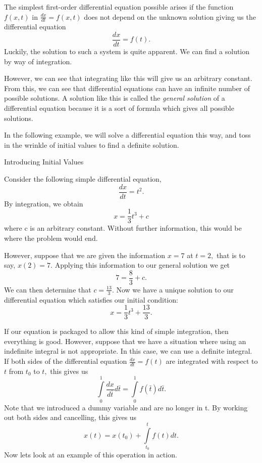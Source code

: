 The simplest first-order differential equation possible arises if the function $f(x,t)$ in $\frac{dx}{dt} = f(x,t)$ does not depend on the unknown solution giving us the differential equation $$\frac{dx}{dt} = f(t).$$ Luckily, the solution to such a system is quite apparent. We can find a solution by way of integration.\newline

However, we can see that integrating like this will give us an arbitrary constant. From this, we can see that differential equations can have an infinite number of possible solutions. A solution like this is called the \emph{general solution} of a differential equation because it is a sort of formula which gives all possible solutions.

 In the following example, we will solve a differential equation this way, and toss in the wrinkle of initial values to find a definite solution.

\begin{example} Introducing Initial Values\newline

Consider the following simple differential equation,
$$\frac{dx}{dt}	= t^2.$$
By integration, we obtain
$$x=\frac{1}{3}t^3 + c$$
where c is an arbitrary constant. Without further information, this would be where the problem would end.\newline

However, suppose that we are given the information $x=7$ at $t=2,$ that is to say, $x(2)=7.$ Applying this information to our general solution we get $$7 = \frac{8}{3} + c.$$ We can then determine that $c=\frac{13}{3}.$ Now we have a unique solution to our differential equation which satisfies our initial condition: $$x=\frac{1}{3}t^3+\frac{13}{3}.$$
\end{example}

If our equation is packaged to allow this kind of simple integration, then everything is good. However, suppose that we have a situation where using an indefinite integral is not appropriate. In this case, we can use a definite integral. If both sides of the differential equation $\frac{dx}{dt}=f(t)$ are integrated with respect to $t$ from $t_0$ to $t,$ this gives us $$\int\limits_0^1 \frac{dx}{d\bar{t}}d\bar{t} = \int\limits_0^1 f(\bar{t})d\bar{t}.$$ Note that we introduced a dummy variable and are no longer in t. By working out both sides and cancelling, this gives us $$x(t) = x(t_0) + \int\limits_{t_0}^t f(t)dt.$$ Now lets look at an example of this operation in action.

